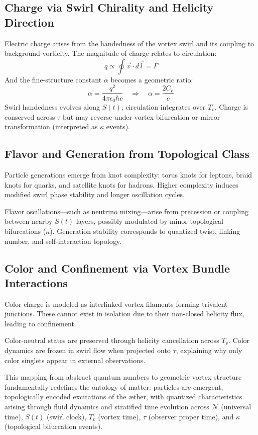 \subsection{Charge via Swirl Chirality and Helicity Direction}

Electric charge arises from the handedness of the vortex swirl and its coupling to background vorticity. The magnitude of charge relates to circulation:
\begin{equation}
q \propto \oint \vec{v} \cdot d\vec{l} = \Gamma
\end{equation}
And the fine-structure constant $\alpha$ becomes a geometric ratio:
\begin{equation}
\alpha = \frac{q^2}{4\pi \epsilon_0 \hbar c} \quad \Rightarrow \quad \alpha = \frac{2C_e}{c}
\end{equation}
Swirl handedness evolves along $S(t)$; circulation integrates over $T_v$. Charge is conserved across $\tau$ but may reverse under vortex bifurcation or mirror transformation (interpreted as $\kappa$ events).

\subsection{Flavor and Generation from Topological Class}

Particle generations emerge from knot complexity: torus knots for leptons, braid knots for quarks, and satellite knots for hadrons. Higher complexity induces modified swirl phase stability and longer oscillation cycles.

Flavor oscillations---such as neutrino mixing---arise from precession or coupling between nearby $S(t)$ layers, possibly modulated by minor topological bifurcations ($\kappa$). Generation stability corresponds to quantized twist, linking number, and self-interaction topology.

\subsection{Color and Confinement via Vortex Bundle Interactions}

Color charge is modeled as interlinked vortex filaments forming trivalent junctions. These cannot exist in isolation due to their non-closed helicity flux, leading to confinement.

Color-neutral states are preserved through helicity cancellation across $T_v$. Color dynamics are frozen in swirl flow when projected onto $\tau$, explaining why only color singlets appear in external observations.

\bigskip

This mapping from abstract quantum numbers to geometric vortex structure fundamentally redefines the ontology of matter: particles are emergent, topologically encoded excitations of the \ae{}ther, with quantized characteristics arising through fluid dynamics and stratified time evolution across $\mathcal{N}$ (universal time), $S(t)$ (swirl clock), $T_v$ (vortex time), $\tau$ (observer proper time), and $\kappa$ (topological bifurcation events).
